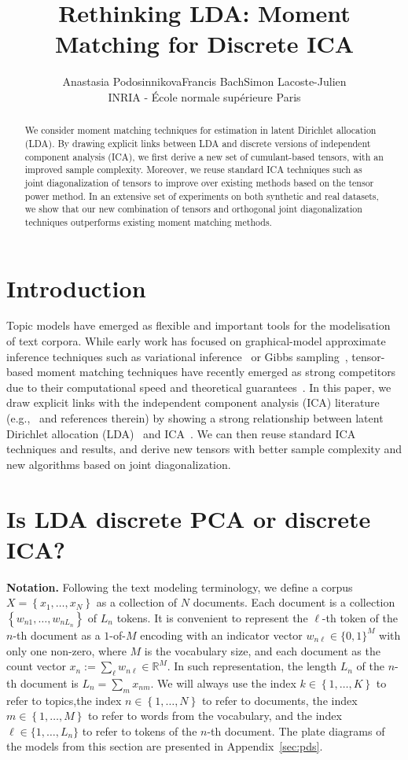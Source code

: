 \documentclass{article}
\title{Rethinking LDA: Moment Matching for Discrete ICA}
\author{
Anastasia Podosinnikova\qquad Francis Bach\qquad Simon Lacoste-Julien   \\
INRIA - \'Ecole normale sup\'erieure Paris\\
}
\newcommand{\emp}[1]{\textbf{#1}}
\newcommand{\cbra}[1]{\left\{#1\right\}}
\newcommand{\rr}[1]{\mathbb{R}^{#1}}
\begin{document}
\maketitle


\begin{abstract}
\noindent
We consider moment matching techniques for estimation in latent Dirichlet allocation (LDA). By drawing explicit links between LDA and discrete versions of independent component analysis (ICA), we first derive a new set of cumulant-based tensors, with an improved sample complexity. Moreover, we reuse standard ICA techniques such as joint diagonalization of tensors to improve over existing methods based on the tensor power method. In an extensive set of experiments on both synthetic and real datasets, we show that our new combination of tensors and orthogonal joint diagonalization techniques outperforms existing moment matching methods.
\end{abstract}


\section{Introduction}
Topic models have emerged as flexible and important tools for the modelisation of text corpora. While early work has focused on graphical-model approximate inference techniques such as variational inference~\cite{BleEtAl2003} or Gibbs sampling~\cite{Gri2002}, tensor-based moment matching techniques have recently emerged as strong competitors due to their computational speed and theoretical guarantees~\cite{AnaEtAl2012,AnaEtAl2014}. In this paper, we draw explicit links with the independent component analysis (ICA) literature (e.g.,~\cite{ComJut2010} and references therein) by showing a strong relationship between latent Dirichlet allocation (LDA)~\cite{BleEtAl2003} and ICA~\cite{Jut1987,JutHer1991,Com1994}. We can then reuse standard ICA techniques and results, and derive new tensors with better sample complexity and new algorithms based on joint diagonalization.




\section{Is LDA discrete PCA or discrete ICA?}\label{sec:2}
\emp{Notation.} Following the text modeling terminology, we define a corpus $X=\cbra{x_1,\dots,x_N}$ as a collection of $N$ documents. Each document is a collection $\cbra{w_{n1},\dots,w_{nL_n}}$ of $L_n$ tokens. It is convenient to represent the $\ell$-th token of the $n$-th document  as a $1$-of-$M$ encoding with an indicator vector $w_{n\ell}\in\{0,1\}^{M}$ with only one non-zero, where $M$ is the vocabulary size, and each document as the count vector $x_n := \sum_{\ell} w_{n\ell}\in\rr{M}$. In such representation, the length $L_n$ of the $n$-th document is $L_n = \sum_m x_{nm}$. We will always use the index $k\in\cbra{1,\dots,K}$ to refer to topics,the  index $n\in\cbra{1,\dots,N}$ to refer to documents, the index $m\in\cbra{1,\dots,M}$ to refer to words from the vocabulary, and the  index $\ell\in\{1,\dots,L_n\}$ to refer to tokens of the $n$-th document. The plate diagrams of the models from this section are presented in Appendix~\ref{sec:pds}.
\end{document}
